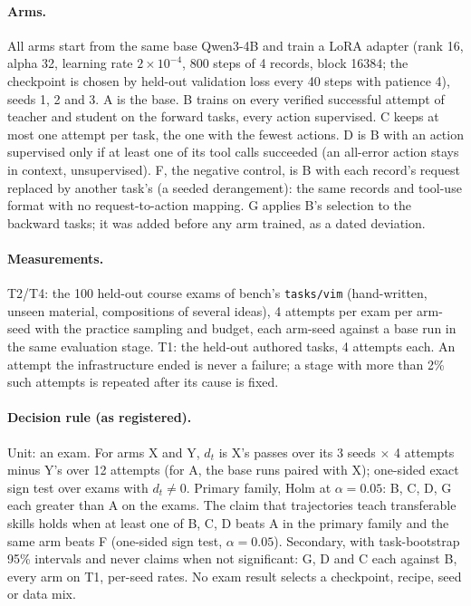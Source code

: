 \paragraph{Arms.} All arms start from the same base Qwen3-4B and train a LoRA adapter (rank 16, alpha 32, learning rate
$2\times10^{-4}$, 800 steps of 4 records, block 16384; the checkpoint is chosen by held-out validation loss every 40 steps
with patience 4), seeds 1, 2 and 3. A is the base. B trains on every verified successful attempt of teacher and student on the
forward tasks, every action supervised. C keeps at most one attempt per task, the one with the fewest actions. D is B with an
action supervised only if at least one of its tool calls succeeded (an all-error action stays in context, unsupervised).
F, the negative control, is B with each record's request replaced by another task's (a seeded derangement): the same records
and tool-use format with no request-to-action mapping. G applies B's selection to the backward tasks; it was added before any
arm trained, as a dated deviation.

\paragraph{Measurements.} T2/T4: the 100 held-out course exams of bench's \texttt{tasks/vim} (hand-written, unseen material,
compositions of several ideas), 4 attempts per exam per arm-seed with the practice sampling and budget, each arm-seed against a
base run in the same evaluation stage. T1: the held-out authored tasks, 4 attempts each. An attempt the infrastructure ended
is never a failure; a stage with more than 2\% such attempts is repeated after its cause is fixed.

\paragraph{Decision rule (as registered).} Unit: an exam. For arms X and Y, $d_t$ is X's passes over its 3 seeds $\times$ 4
attempts minus Y's over 12 attempts (for A, the base runs paired with X); one-sided exact sign test over exams with
$d_t\neq0$. Primary family, Holm at $\alpha=0.05$: B, C, D, G each greater than A on the exams. The claim that trajectories
teach transferable skills holds when at least one of B, C, D beats A in the primary family and the same arm beats F
(one-sided sign test, $\alpha=0.05$). Secondary, with task-bootstrap 95\% intervals and never claims when not significant:
G, D and C each against B, every arm on T1, per-seed rates. No exam result selects a checkpoint, recipe, seed or data mix.

